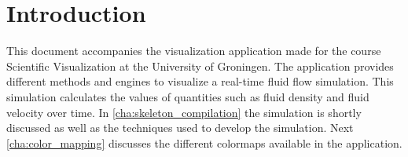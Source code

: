 \chapter*{Introduction} %
\label{cha:introduction}
 
This document accompanies the visualization application made for the course Scientific Visualization at the University of Groningen. The application provides different methods and engines to visualize a real-time fluid flow simulation. This simulation calculates the values of quantities such as fluid density and fluid velocity over time. In \cref{cha:skeleton_compilation} the simulation is shortly discussed as well as the techniques used to develop the simulation. Next \cref{cha:color_mapping} discusses the different colormaps available in the application.

